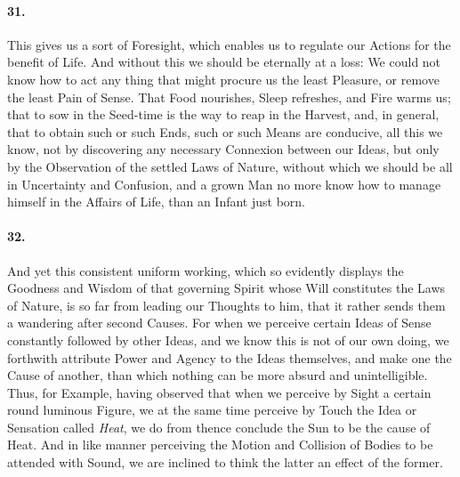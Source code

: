 \documentclass[]{article}
\newenvironment{sectionbody}{\begin{multicols}{2}}{\end{multicols}}
\begin{document}
\begin{sectionbody}
\paragraph{31.} This gives us a sort of Foresight, which enables us to regulate
our Actions for the benefit of Life.  And without this we should
be eternally at a loss: We could not know how to act any thing
that might procure us the least Pleasure, or remove the least
Pain of Sense.  That Food nourishes, Sleep refreshes, and Fire
warms us; that to sow in the Seed-time is the way to reap in the
Harvest, and, in general, that to obtain such or such Ends, such
or such Means are conducive, all this we know, not by discovering
any necessary Connexion between our Ideas, but only by the
Observation of the settled Laws of Nature, without which we
should be all in Uncertainty and Confusion, and a grown Man no
more know how to manage himself in the Affairs of Life, than an
Infant just born.



\paragraph{32.} And yet this consistent uniform working, which so evidently
displays the Goodness and Wisdom of that governing Spirit whose
Will constitutes the Laws of Nature, is so far from leading our
Thoughts to him, that it rather sends them a wandering after
second Causes.  For when we perceive certain Ideas of Sense
constantly followed by other Ideas, and we know this is not of
our own doing, we forthwith attribute Power and Agency to the
Ideas themselves, and make one the Cause of another, than which
nothing can be more absurd and unintelligible.  Thus, for
Example, having observed that when we perceive by Sight a certain
round luminous Figure, we at the same time perceive by Touch the
Idea or Sensation called \emph{Heat}, we do from thence
conclude the Sun to be the cause of Heat.  And in like manner
perceiving the Motion and Collision of Bodies to be attended with
Sound, we are inclined to think the latter an effect of the
former.




\end{sectionbody}
\end{document}
